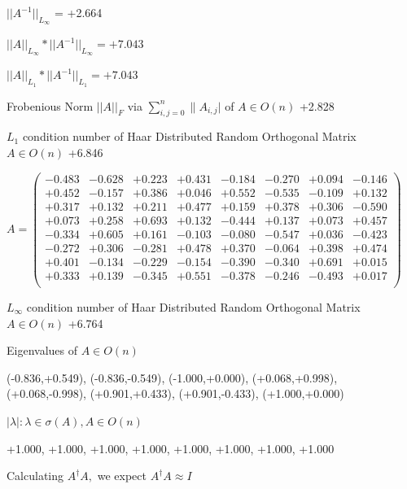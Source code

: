 \documentclass[9pt]{article}
\theoremstyle{plain}
\theoremstyle{definition}
\theoremstyle{remark}
\numberwithin{equation}{section}
\begin{document}
$||A^{-1}||_{L_{\infty}}$ = +2.664

$||A||_{L_{\infty}} * ||A^{-1}||_{L_{\infty}} = +7.043$

$||A||_{L_1} * ||A^{-1}||_{L_1} = +7.043$

Frobenious Norm  $||A||_{\textit{F}}$ via $\sum\limits_{i,j =0}^{n} \|A_{i,j}|$   of  $A \in O(n)$  +2.828

$L_1$ condition number of Haar Distributed Random Orthogonal Matrix $A \in O(n)$ +6.846

$A = \left(
\begin{array}{
cccccccc}
-0.483 & -0.628 & +0.223 & +0.431 & -0.184 & -0.270 & +0.094 & -0.146 \\
+0.452 & -0.157 & +0.386 & +0.046 & +0.552 & -0.535 & -0.109 & +0.132 \\
+0.317 & +0.132 & +0.211 & +0.477 & +0.159 & +0.378 & +0.306 & -0.590 \\
+0.073 & +0.258 & +0.693 & +0.132 & -0.444 & +0.137 & +0.073 & +0.457 \\
-0.334 & +0.605 & +0.161 & -0.103 & -0.080 & -0.547 & +0.036 & -0.423 \\
-0.272 & +0.306 & -0.281 & +0.478 & +0.370 & -0.064 & +0.398 & +0.474 \\
+0.401 & -0.134 & -0.229 & -0.154 & -0.390 & -0.340 & +0.691 & +0.015 \\
+0.333 & +0.139 & -0.345 & +0.551 & -0.378 & -0.246 & -0.493 & +0.017 \\
\end{array}
\right)$ \newline 

$L_{\infty}$ condition number of Haar Distributed Random Orthogonal Matrix $A \in O(n)$ +6.764

Eigenvalues of $A \in O(n)$

(-0.836,+0.549), (-0.836,-0.549), (-1.000,+0.000), (+0.068,+0.998), (+0.068,-0.998), (+0.901,+0.433), (+0.901,-0.433), (+1.000,+0.000)

 $|\lambda | : \lambda \in \sigma(A) , A \in O(n)$

+1.000, +1.000, +1.000, +1.000, +1.000, +1.000, +1.000, +1.000


Calculating $A^{\dag} A,$  we expect $A^{\dag} A \approx I$
\end{document}

